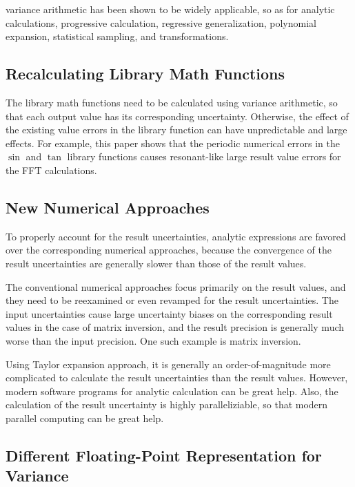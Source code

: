 \documentclass[twoside]{article}
\numberwithin{equation}{section}
\begin{document}
variance arithmetic has been shown to be widely applicable, so as for analytic calculations, progressive calculation, regressive generalization, polynomial expansion, statistical sampling, and transformations.


\subsection{Recalculating Library Math Functions}

The library math functions need to be calculated using variance arithmetic, so that each output value has its corresponding uncertainty.
Otherwise, the effect of the existing value errors in the library function can have unpredictable and large effects.
For example, this paper shows that the periodic numerical errors in the $\sin$ and $\tan$ library functions causes resonant-like large result value errors for the FFT calculations.



\subsection{New Numerical Approaches}

To properly account for the result uncertainties, analytic expressions are favored over the corresponding numerical approaches, because the convergence of the result uncertainties are generally slower than those of the result values.

The conventional numerical approaches focus primarily on the result values, and they need to be reexamined or even revamped for the result uncertainties.
The input uncertainties cause large uncertainty biases on the corresponding result values in the case of matrix inversion,  and the result precision is generally much worse than the input precision.
One such example is matrix inversion.

Using Taylor expansion approach, it is generally an order-of-magnitude more complicated to calculate the result uncertainties than the result values.
However, modern software programs for analytic calculation can be great help.
Also, the calculation of the result uncertainty is highly paralleliziable, so that modern parallel computing can be great help. 


\subsection{Different Floating-Point Representation for Variance}
\end{document}
